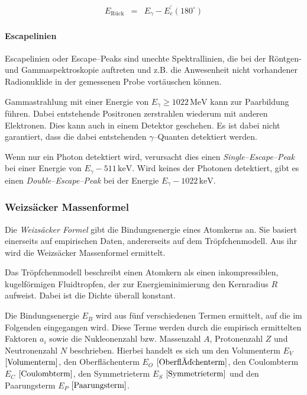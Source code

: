 \documentclass[12pt,a4paper]{scrartcl}
\numberwithin{equation}{section} %
\newcommand{\pu}[1]{\ensuremath{\mathrm{#1}}}
\begin{document}
\begin{eqnarray}
    E_\mathrm{Rück} &=& E_\gamma - E_e^\prime(180^\circ)
\end{eqnarray}

\paragraph{Escapelinien}

Escapelinien oder Escape--Peaks sind unechte Spektrallinien, die bei der Röntgen- und Gammaspektroskopie auftreten und z.B. die Anwesenheit nicht vorhandener Radionuklide in der gemessenen Probe vortäuschen können. \cite{Escapelinie}

Gammastrahlung mit einer Energie von $E_\gamma\ge\pu{1022\,MeV}$ kann zur Paarbildung führen. Dabei entstehende Positronen zerstrahlen wiederum mit anderen Elektronen. Dies kann auch in einem Detektor geschehen. Es ist dabei nicht garantiert, dass die dabei entstehenden $\gamma$--Quanten detektiert werden. \cite{Bethge}

Wenn nur ein Photon detektiert wird, verursacht dies einen \emph{Single--Escape--Peak} bei einer Energie von
$E_\gamma - \pu{511\, keV}$. Wird keines der Photonen detektiert, gibt es einen \emph{Double--Escape--Peak} bei der Energie $E_\gamma - \pu{1022\, keV}$.

\hypertarget{weizsuxe4cker-massenformel}{%
	\subsubsection{Weizsäcker Massenformel}\label{weizsuxe4cker-massenformel}}
Die \emph{Weizsäcker Formel} gibt die Bindungsenergie eines Atomkerns an. Sie basiert einerseits auf empirischen Daten, andererseits auf dem Tröpfchenmodell. Aus ihr wird die Weizsäcker Massenformel ermittelt.

Das Tröpfchenmodell beschreibt einen Atomkern als einen inkompressiblen, kugelförmigen Fluidtropfen, der zur Energieminimierung den Kernradius $R$ aufweist. Dabei ist die Dichte überall konstant.

Die Bindungsenergie $E_B$ wird aus fünf verschiedenen Termen ermittelt, auf die im Folgenden eingegangen wird. Diese Terme werden durch die empirisch ermittelten Faktoren $a_i$ sowie die Nukleonenzahl bzw. Massenzahl $A$, Protonenzahl $Z$ und Neutronenzahl $N$ beschrieben. Hierbei handelt es sich um den Volumenterm $E_V$ $\eqref{Volumenterm}$, den Oberflächenterm $E_O$ $\eqref{Oberflächenterm}$, den Coulombterm $E_C$ $\eqref{Coulombterm}$, den Symmetrieterm $E_S$ $\eqref{Symmetrieterm}$ und den Paarungsterm $E_P$ $\eqref{Paarungsterm}$.
\end{document}
